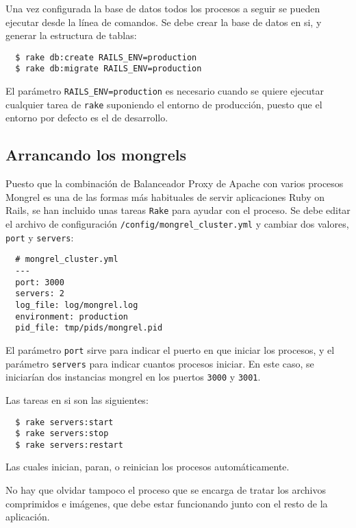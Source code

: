 Una vez configurada la base de datos todos los procesos a seguir se pueden ejecutar desde la línea de comandos. Se debe crear la base de datos en si, y generar la estructura de tablas:

\begin{verbatim}
  $ rake db:create RAILS_ENV=production
  $ rake db:migrate RAILS_ENV=production
\end{verbatim}

El parámetro \texttt{RAILS\_ENV=production} es necesario cuando se quiere ejecutar cualquier tarea de \texttt{rake} suponiendo el entorno de producción, puesto que el entorno por defecto es el de desarrollo.


\subsection{Arrancando los mongrels} %
\label{sub:arrancando_los_mongrels}

Puesto que la combinación de Balanceador Proxy de Apache con varios procesos Mongrel es una de las formas más habituales de servir aplicaciones Ruby on Rails, se han incluido unas tareas \texttt{Rake} para ayudar con el proceso. Se debe editar el archivo de configuración \texttt{/config/mongrel\_cluster.yml} y cambiar dos valores, \texttt{port} y \texttt{servers}:

\begin{verbatim}
  # mongrel_cluster.yml
  --- 
  port: 3000
  servers: 2
  log_file: log/mongrel.log
  environment: production
  pid_file: tmp/pids/mongrel.pid  
\end{verbatim}

El parámetro \texttt{port} sirve para indicar el puerto en que iniciar los procesos, y el parámetro \texttt{servers} para indicar cuantos procesos iniciar. En este caso, se iniciarían dos instancias mongrel en los puertos \texttt{3000} y \texttt{3001}.

Las tareas en si son las siguientes:

\begin{verbatim}
  $ rake servers:start
  $ rake servers:stop
  $ rake servers:restart
\end{verbatim}

Las cuales inician, paran, o reinician los procesos automáticamente.

No hay que olvidar tampoco el proceso que se encarga de tratar los archivos comprimidos e imágenes, que debe estar funcionando junto con el resto de la aplicación.

